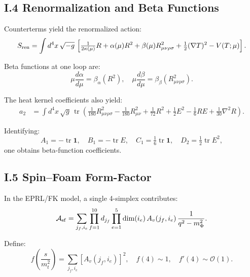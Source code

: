 \documentclass{article}
\DeclareMathOperator{\tr}{tr}
\begin{document}
\subsection*{I.4 Renormalization and Beta Functions }
Counterterms yield the renormalized action:
\begin{equation}\label{eq:auto209}
S_{\rm ren}
  = \int d^4x\,\sqrt{-g}\,
  \left[\tfrac1{2\kappa(\mu)}R
    +\alpha(\mu)R^2
    +\beta(\mu)R_{\mu\nu\rho\sigma}^2
    +\tfrac12(\nabla T)^2
    -V(T;\mu)\right].
\end{equation}

Beta functions at one loop are:
\begin{equation}\label{eq:auto210}
\mu\frac{d\alpha}{d\mu}
  =\beta_\alpha(R^2),\quad
  \mu\frac{d\beta}{d\mu}
  =\beta_\beta(R_{\mu\nu\rho\sigma}^2).
\end{equation}

The heat kernel coefficients also yield:
\begin{equation}\label{eq:auto211}
\begin{aligned}
  a_2 &= \int d^4x\,\sqrt{g}\,\tr\left(
    \tfrac1{180}R_{\mu\nu\rho\sigma}^2
   -\tfrac1{180}R_{\mu\nu}^2
   +\tfrac1{72}R^2
   +\tfrac12E^2
   -\tfrac16RE
   +\tfrac1{30}\nabla^2R
  \right).
\end{aligned}
\end{equation}

Identifying:
\begin{equation}\label{eq:auto212}
A_1=-\tr\mathbf1,\quad
B_1=-\tr E,\quad
C_1=\tfrac16\tr\mathbf1,\quad
D_2=\tfrac12\tr E^2,
\end{equation}
one obtains beta-function coefficients.

\subsection*{I.5 Spin–Foam Form-Factor }
In the EPRL/FK model, a single 4-simplex contributes:
\begin{equation}\label{eq:auto213}
\mathcal A_{\rm sf}
= \sum_{j_f,i_e}
  \prod_{f=1}^{10}d_{j_f}
  \prod_{e=1}^5 \dim(i_e)\,
  A_v(j_f,i_e)\,\frac{1}{q^2-m_\Phi^2}.
\end{equation}

Define:
\begin{equation}\label{eq:auto214}
f\!\left(\frac{s}{m_t^2}\right)
= \sum_{j_f,i_e}\left[A_v(j_f,i_e)\right]^2,
\quad
f(4)\sim1,\quad
f'(4)\sim\mathcal O(1).
\end{equation}
\end{document}

